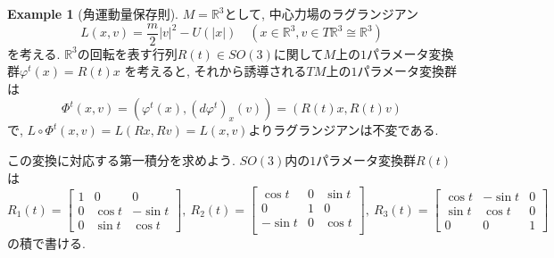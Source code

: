 \documentclass[a4paper]{ujarticle}
\numberwithin{equation}{section}
\theoremstyle{definition}
\newtheorem{example}{Example}
\begin{document}
    \begin{example}[角運動量保存則]
        $M = \mathbb{R}^3$として, 中心力場のラグランジアン
        \[
            L(x, v) = \frac{m}{2}|v|^2 - U(|x|) \quad (x \in \mathbb{R}^3, v \in T \mathbb{R}^3 \cong \mathbb{R}^3)
        \]  
        を考える. 
        $\mathbb{R}^3$の回転を表す行列$R(t) \in SO(3)$に関して$M$上の$1$パラメータ変換群$\varphi^{t}(x) = R(t) x$
        を考えると, それから誘導される$TM$上の$1$パラメータ変換群は
        \[
            \Phi^{t}(x, v) = (\varphi^{t}(x), (d \varphi^{t})_{x} (v)) = (R(t) x, R(t) v)
        \]
        で, $L \circ \Phi^{t}(x, v) = L(Rx, Rv) = L(x, v)$よりラグランジアンは不変である.

        この変換に対応する第一積分を求めよう.
        $SO(3)$内の$1$パラメータ変換群$R(t)$は
        \[
            R_1(t) = 
            \begin{bmatrix}
                1 & 0 & 0 \\
                0 & \cos{t} & - \sin{t} \\
                0 & \sin{t} & \cos{t}   
            \end{bmatrix}, 
            \ 
            R_2(t) = 
            \begin{bmatrix}
                \cos{t} & 0 & \sin{t} \\
                0 & 1 & 0 \\
                -\sin{t} & 0 & \cos{t} \\
            \end{bmatrix}, 
            \ 
            R_3(t) = 
            \begin{bmatrix}
                \cos{t} & - \sin{t} & 0\\
                \sin{t} & \cos{t} & 0\\
                0 & 0 & 1
            \end{bmatrix}
        \]
        の積で書ける.
        

\end{example}
\end{document}
